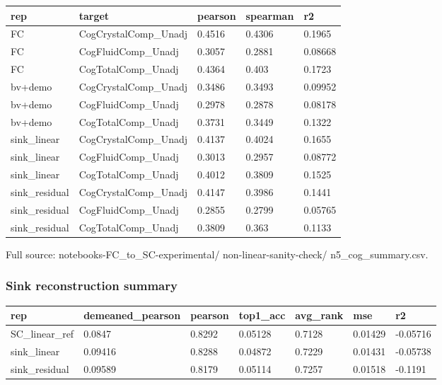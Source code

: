 {\def\LTcaptype{none} %
\begin{longtable}[]{@{}lllll@{}}
\toprule\noalign{}
rep & target & pearson & spearman & r2 \\
\midrule\noalign{}
\endhead
\bottomrule\noalign{}
\endlastfoot
FC & CogCrystalComp\_Unadj & 0.4516 & 0.4306 & 0.1965 \\
FC & CogFluidComp\_Unadj & 0.3057 & 0.2881 & 0.08668 \\
FC & CogTotalComp\_Unadj & 0.4364 & 0.403 & 0.1723 \\
bv+demo & CogCrystalComp\_Unadj & 0.3486 & 0.3493 & 0.09952 \\
bv+demo & CogFluidComp\_Unadj & 0.2978 & 0.2878 & 0.08178 \\
bv+demo & CogTotalComp\_Unadj & 0.3731 & 0.3449 & 0.1322 \\
sink\_linear & CogCrystalComp\_Unadj & 0.4137 & 0.4024 & 0.1655 \\
sink\_linear & CogFluidComp\_Unadj & 0.3013 & 0.2957 & 0.08772 \\
sink\_linear & CogTotalComp\_Unadj & 0.4012 & 0.3809 & 0.1525 \\
sink\_residual & CogCrystalComp\_Unadj & 0.4147 & 0.3986 & 0.1441 \\
sink\_residual & CogFluidComp\_Unadj & 0.2855 & 0.2799 & 0.05765 \\
sink\_residual & CogTotalComp\_Unadj & 0.3809 & 0.363 & 0.1133 \\
\end{longtable}
}

Full source: notebooks-FC\_to\_SC-experimental/ non-linear-sanity-check/ n5\_cog\_summary.csv.

\subsubsection{Sink reconstruction summary}\label{sink-reconstruction-summary}

{\def\LTcaptype{none} %
\begin{longtable}[]{@{}lllllll@{}}
\toprule\noalign{}
rep & demeaned\_pearson & pearson & top1\_acc & avg\_rank & mse & r2 \\
\midrule\noalign{}
\endhead
\bottomrule\noalign{}
\endlastfoot
SC\_linear\_ref & 0.0847 & 0.8292 & 0.05128 & 0.7128 & 0.01429 & -0.05716 \\
sink\_linear & 0.09416 & 0.8288 & 0.04872 & 0.7229 & 0.01431 & -0.05738 \\
sink\_residual & 0.09589 & 0.8179 & 0.05114 & 0.7257 & 0.01518 & -0.1191 \\
\end{longtable}
}

